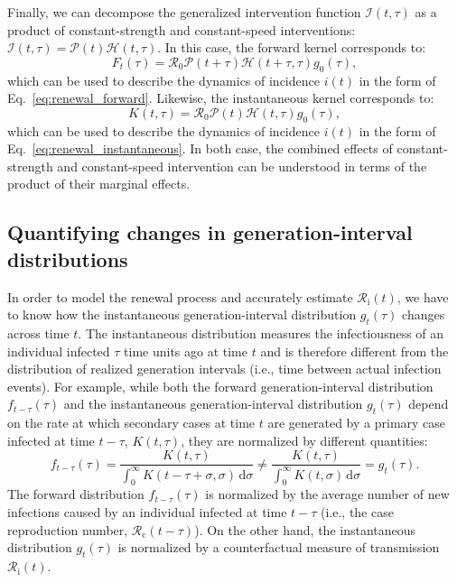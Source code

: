 \documentclass[12pt]{article}
\newcommand{\eref}[1]{Eq.~\ref{eq:#1}}
\newcommand{\Rx}[1]{\ensuremath{{\mathcal R}_{#1}}\xspace}
\newcommand{\Ro}{\Rx{0}}
\newcommand{\Rc}{\Rx{\mathrm{c}}}
\newcommand{\Ri}{\Rx{\mathrm{i}}}
\newcommand{\dd}[1]{\ensuremath{\, \mathrm{d}#1}}
\newcommand{\dsigma}{\dd{\sigma}}
\newcommand{\PP}{\ensuremath{\mathcal P}}
\newcommand{\II}{\ensuremath{\mathcal I}}
\newcommand{\HH}{\ensuremath{\mathcal H}}
\begin{document}
Finally, we can decompose the generalized intervention function $\II(t, \tau)$ as a product of constant-strength and constant-speed interventions: $\II(t, \tau) = \PP(t) \HH(t, \tau)$.
In this case, the forward kernel corresponds to:
\begin{equation}
F_t(\tau) = \Ro \PP(t+\tau) \HH(t+\tau, \tau) g_0(\tau),
\end{equation}
which can be used to describe the dynamics of incidence $i(t)$ in the form of \eref{renewal_forward}.  
Likewise, the instantaneous kernel corresponds to: 
\begin{equation}
K(t, \tau) = \Ro \PP(t) \HH(t, \tau) g_0(\tau),
\end{equation}
which can be used to describe the dynamics of incidence $i(t)$  in the form of \eref{renewal_instantaneous}.
In both case, the combined effects of constant-strength and constant-speed intervention can be understood in terms of the product of their marginal effects.

\subsection{Quantifying changes in generation-interval distributions}
\label{ss:instg}

In order to model the renewal process and accurately estimate $\Ri(t)$, we have to know how the instantaneous generation-interval distribution $g_t(\tau)$ changes across time $t$.
The instantaneous distribution measures the infectiousness of an individual infected $\tau$ time units ago at time $t$ and is therefore different from the distribution of realized generation intervals (i.e., time between actual infection events).
For example, while both the forward generation-interval distribution $f_{t-\tau}(\tau)$ and the instantaneous generation-interval distribution $g_t(\tau)$ depend on the rate at which secondary cases at time $t$ are generated by a primary case infected at time $t-\tau$, $K(t, \tau)$, they are normalized by different quantities:
\begin{equation}
f_{t-\tau}(\tau) = \frac{K(t,\tau)}{\int_0^\infty K(t-\tau+\sigma,\sigma) \dsigma} \neq \frac{K(t,\tau)}{\int_0^\infty K(t,\sigma) \dsigma} = g_t(\tau).
\end{equation}
The forward distribution $f_{t-\tau}(\tau)$ is normalized by the average number of new infections caused by an individual infected at time $t-\tau$ (i.e., the case reproduction number, $\Rc(t-\tau)$).
On the other hand, the instantaneous distribution $g_t(\tau)$ is normalized by a counterfactual measure of transmission $\Ri(t)$.
\end{document}
